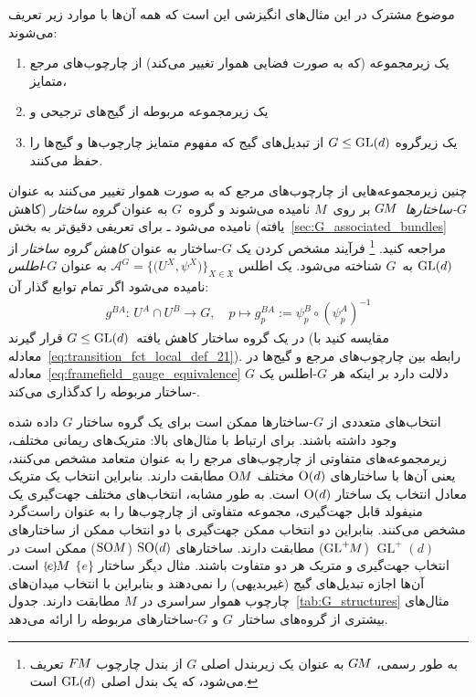 \begin{samepage}
	موضوع مشترک در این مثال‌های انگیزشی این است که همه آن‌ها با موارد زیر تعریف می‌شوند:
	\begin{enumerate}
		\item یک زیرمجموعه (که به صورت فضایی هموار تغییر می‌کند) از چارچوب‌های مرجع متمایز،
		\item یک زیرمجموعه مربوطه از گیج‌های ترجیحی و
		\item یک زیرگروه $G \leq \operatorname{GL}(d)$ از تبدیل‌های گیج که مفهوم متمایز چارچوب‌ها و گیج‌ها را حفظ می‌کنند.
	\end{enumerate}
\end{samepage}
چنین زیرمجموعه‌هایی از چارچوب‌های مرجع که به صورت هموار تغییر می‌کنند به عنوان \emph{$G$-ساختارها}~$G\mkern-1.4muM$ بر روی~$M$ نامیده می‌شوند
و گروه~$G$ به عنوان \emph{گروه ساختار} (کاهش یافته) نامیده می‌شود ـ برای تعریفی دقیق‌تر به بخش~\ref{sec:G_associated_bundles} مراجعه کنید.%
\footnote{
	به طور رسمی، $G\mkern-1.4muM$ به عنوان یک زیربندل اصلی $G$ از بندل چارچوب $F\mkern-1.5muM$ تعریف می‌شود، که یک بندل اصلی $\operatorname{GL}(d)$ است.
}
فرآیند مشخص کردن یک $G$-ساختار به عنوان \emph{کاهش گروه ساختار} از $\operatorname{GL}(d)$ به~$G$ شناخته می‌شود.
یک اطلس ${\mathscr{A}^G = \big\{\! \big(U^X, \psi^X\big) \!\big\}_{X\in \mathfrak{X}}}$ به عنوان $G$-\emph{اطلس} نامیده می‌شود اگر تمام توابع گذار آن:
\begin{align}\label{eq:transition_fct_local_def_21_G_atlas}
	g^{BA}\!:\, U^A\cap U^B\to G, \quad p \mapsto g_p^{BA} := \psi_p^B \circ \left(\psi_p^A\right)^{-1}
\end{align}
در یک گروه ساختار کاهش یافته~$G \leq \operatorname{GL}(d)$ قرار گیرند (مقایسه کنید با معادله~\eqref{eq:transition_fct_local_def_21}).
رابطه بین چارچوب‌های مرجع و گیج‌ها در معادله~\eqref{eq:framefield_gauge_equivalence} دلالت دارد بر اینکه هر $G$-اطلس یک $G$-ساختار مربوطه را کدگذاری می‌کند.


انتخاب‌های متعددی از $G$-ساختارها ممکن است برای یک گروه ساختار $G$ داده شده وجود داشته باشند.
برای ارتباط با مثال‌های بالا:
متریک‌های ریمانی مختلف، زیرمجموعه‌های متفاوتی از چارچوب‌های مرجع را به عنوان متعامد مشخص می‌کنند، یعنی آن‌ها با ساختارهای $\operatorname{O}(d)$ مختلف $\operatorname{O}\mkern-3.6muM$ مطابقت دارند.
بنابراین انتخاب یک متریک معادل انتخاب یک ساختار $\operatorname{O}(d)$ است.
به طور مشابه، انتخاب‌های مختلف جهت‌گیری یک منیفولد قابل جهت‌گیری، مجموعه متفاوتی از چارچوب‌ها را به عنوان راست‌گرد مشخص می‌کنند.
بنابراین دو انتخاب ممکن جهت‌گیری با دو انتخاب ممکن از ساختارهای $\operatorname{GL}^+(d)$ ($\operatorname{GL}^+\mkern-5muM$) مطابقت دارند.
ساختارهای $\operatorname{SO}(d)$ ($\operatorname{SO}\mkern-3.6muM$) ممکن است در انتخاب جهت‌گیری و متریک هر دو متفاوت باشند.
مثال دیگر ساختار $\{e\}$ $\eM$ است.
آن‌ها اجازه تبدیل‌های گیج (غیربدیهی) را نمی‌دهند و بنابراین با انتخاب میدان‌های چارچوب هموار سراسری در $M$ مطابقت دارند.
جدول~\ref{tab:G_structures} مثال‌های بیشتری از گروه‌های ساختار~$G$ و $G$-ساختارهای مربوطه را ارائه می‌دهد.


